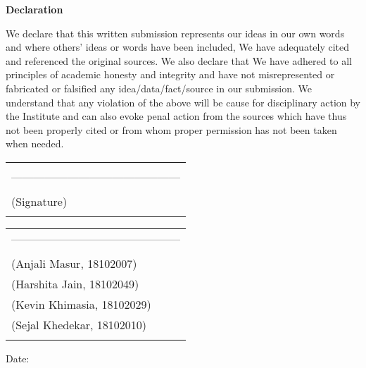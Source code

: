 \newpage
\thispagestyle{empty}
\vspace*{0.2cm}
\vspace{1cm}
\begin{center}
 \large\textbf{Declaration}
\end{center}
\vspace{1cm}
We declare that this written submission represents our ideas in our own words 
and where others' ideas or words have been included, We have adequately cited and referenced the original sources. We also declare that We have adhered to all 
principles of academic honesty and integrity and have not misrepresented 
or fabricated or falsified any idea/data/fact/source in our submission. We understand that any violation of the above will be cause for disciplinary action by the Institute and can also evoke penal action from the sources which have thus not been properly cited or from whom proper permission has not been taken when needed. 

\hfill
\begin{tabular}{@{}l@{}}
\vspace{10 mm}\\
---------------------------------------------\\
\vspace{0.5 mm}\\
\hspace{22 mm} (Signature)\\
\vspace{5 mm}
\end{tabular}

\hfill
\begin{tabular}{@{}l@{}}
---------------------------------------------\\
\vspace{0.5 mm}\\
\hspace{0.5 mm} (Anjali Masur, 18102007)\\
\hspace{0.5 mm} (Harshita Jain, 18102049)\\
\hspace{0.5 mm} (Kevin Khimasia, 18102029)\\
\hspace{0.5 mm} (Sejal Khedekar, 18102010)\\
\vspace{5 mm}
\end{tabular}


Date:

\clearpage